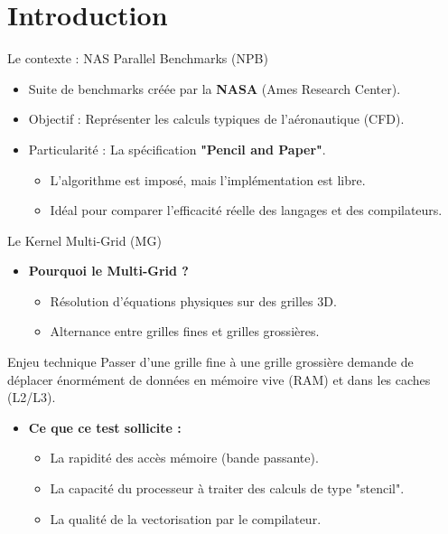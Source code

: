 \section[Introduction]{Introduction}

\begin{frame}{Le contexte : NAS Parallel Benchmarks (NPB)}
    \begin{itemize}
        \item Suite de benchmarks créée par la \textbf{NASA} (Ames Research Center).
        \item Objectif : Représenter les calculs typiques de l'aéronautique (CFD).
        \item Particularité : La spécification \textbf{"Pencil and Paper"}.
            \begin{itemize}
                \item L'algorithme est imposé, mais l'implémentation est libre.
                \item Idéal pour comparer l'efficacité réelle des langages et des compilateurs.
            \end{itemize}
    \end{itemize}
\end{frame}

\begin{frame}{Le Kernel Multi-Grid (MG)}
    \begin{itemize}
        \item \textbf{Pourquoi le Multi-Grid ?}
            \begin{itemize}
                \item Résolution d'équations physiques sur des grilles 3D.
                \item Alternance entre grilles fines et grilles grossières.
            \end{itemize}
    \end{itemize}
    \begin{alertblock}{Enjeu technique}
        Passer d'une grille fine à une grille grossière demande de déplacer énormément de données en mémoire vive (RAM) et dans les caches (L2/L3).
    \end{alertblock}
    \begin{itemize}
        \item \textbf{Ce que ce test sollicite :}
            \begin{itemize}
                \item La rapidité des accès mémoire (bande passante).
                \item La capacité du processeur à traiter des calculs de type "stencil".
                \item La qualité de la vectorisation par le compilateur.
            \end{itemize}
    \end{itemize}
\end{frame}

